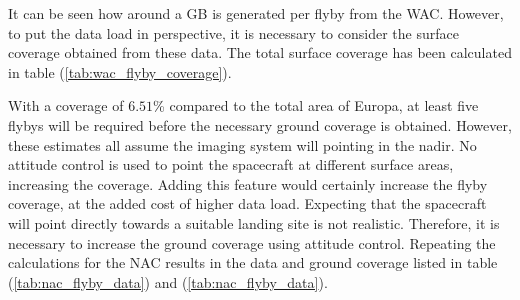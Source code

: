 It can be seen how around a GB is generated per flyby from the WAC. However, to put the data load in perspective, it is necessary to consider the surface coverage obtained from these data. The total surface coverage has been calculated in table (\ref{tab:wac_flyby_coverage}).
\begin{table}[htb!]
  \centering
  \caption{The surface coverage provided during a single flyby, using the WAC.}
  \label{tab:wac_flyby_coverage}%
\end{table}%
With a coverage of $6.51$\% compared to the total area of Europa, at least five flybys will be required before the necessary ground coverage is obtained. However, these estimates all assume the imaging system will pointing in the nadir. No attitude control is used to point the spacecraft at different surface areas, increasing the coverage. Adding this feature would certainly increase the flyby coverage, at the added cost of higher data load. Expecting that the spacecraft will point directly towards a suitable landing site is not realistic. Therefore, it is necessary to increase the ground coverage using attitude control. Repeating the calculations for the NAC results in the data and ground coverage listed in table (\ref{tab:nac_flyby_data}) and (\ref{tab:nac_flyby_data}).
